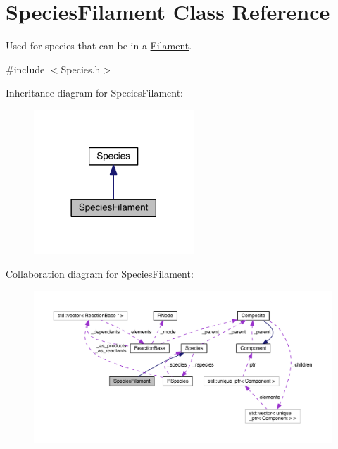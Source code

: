 \hypertarget{classSpeciesFilament}{\section{Species\+Filament Class Reference}
\label{classSpeciesFilament}
}


Used for species that can be in a \hyperlink{classFilament}{Filament}.  




{\ttfamily \#include $<$Species.\+h$>$}



Inheritance diagram for Species\+Filament\+:\nopagebreak
\begin{figure}[H]
\begin{center}
\leavevmode
\includegraphics[width=170pt]{classSpeciesFilament__inherit__graph}
\end{center}
\end{figure}


Collaboration diagram for Species\+Filament\+:\nopagebreak
\begin{figure}[H]
\begin{center}
\leavevmode
\includegraphics[width=350pt]{classSpeciesFilament__coll__graph}
\end{center}
\end{figure}
